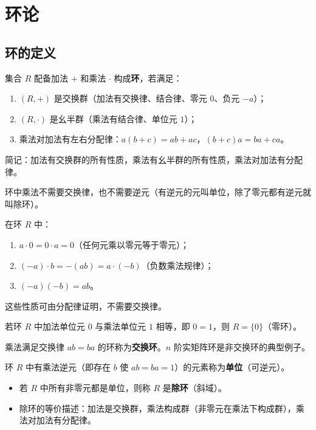\chapter{环论}

\section{环的定义}

\begin{definition}[环（定义 2.1）]
集合 $R$ 配备加法 $+$ 和乘法 $\cdot$ 构成\textbf{环}，若满足：
\begin{enumerate}
  \item $(R, +)$ 是交换群（加法有交换律、结合律、零元 $0$、负元 $-a$）；
  \item $(R, \cdot)$ 是幺半群（乘法有结合律、单位元 $1$）；
  \item 乘法对加法有左右分配律：$a(b+c) = ab + ac$，$(b+c)a = ba + ca$。
\end{enumerate}
简记：加法有交换群的所有性质，乘法有幺半群的所有性质，乘法对加法有分配律。
\end{definition}

\begin{note}
环中乘法不需要交换律，也不需要逆元（有逆元的元叫单位，除了零元都有逆元就叫除环）。
\end{note}

\begin{proposition}[命题 2.1：零元与负元的运算]
在环 $R$ 中：
\begin{enumerate}
  \item $a \cdot 0 = 0 \cdot a = 0$（任何元乘以零元等于零元）；
  \item $(-a) \cdot b = -(ab) = a \cdot (-b)$（负数乘法规律）；
  \item $(-a)(-b) = ab$。
\end{enumerate}
这些性质可由分配律证明，不需要交换律。
\end{proposition}

\begin{proposition}[命题 2.2：零环]
若环 $R$ 中加法单位元 $0$ 与乘法单位元 $1$ 相等，即 $0 = 1$，则 $R = \{0\}$（零环）。
\end{proposition}

\begin{definition}[交换环（定义 2.2）]
乘法满足交换律 $ab = ba$ 的环称为\textbf{交换环}。$n$ 阶实矩阵环是非交换环的典型例子。
\end{definition}

\begin{definition}[单位与除环（定义 2.3, 2.4）]
环 $R$ 中有乘法逆元（即存在 $b$ 使 $ab = ba = 1$）的元素称为\textbf{单位}（可逆元）。
\begin{itemize}
  \item 若 $R$ 中所有非零元都是单位，则称 $R$ 是\textbf{除环}（斜域）。
  \item 除环的等价描述：加法是交换群，乘法构成群（非零元在乘法下构成群），乘法对加法有分配律。
\end{itemize}
\end{definition}

